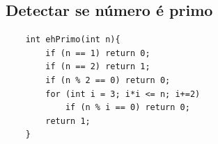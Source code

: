 \subsection{Detectar se número é primo}
\begin{verbatim}
    int ehPrimo(int n){
        if (n == 1) return 0;
        if (n == 2) return 1;
        if (n % 2 == 0) return 0;
        for (int i = 3; i*i <= n; i+=2)
            if (n % i == 0) return 0;
        return 1;
    }
\end{verbatim}



\pagebreak
